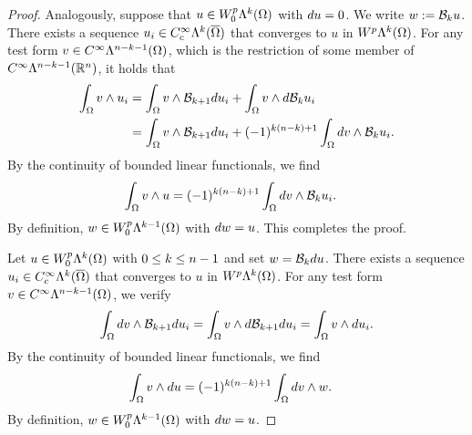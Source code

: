 \documentclass[10pt,a4paper]{article}
\begin{document}
\begin{proof}
    
    Analogously, suppose that $u \in W^{p}_{0}\Lambda^{k}(\Omega)$ with $d u = 0$. 
    We write $w := {\mathcal B}_{k} u$. 
    There exists a sequence $u_{i} \in C^{\infty}_{c}\Lambda^{k}(\overline\Omega)$ that converges to $u$ in $W^{p}\Lambda^{k}(\Omega)$. 
    For any test form $v \in C^{\infty}\Lambda^{n-k-1}(\Omega)$, 
    which is the restriction of some member of $C^{\infty}\Lambda^{n-k-1}({\mathbb R}^{n})$, 
    it holds that 
    \begin{align*}
        \int_{\Omega} v \wedge u_{i} 
        &=
        \int_{\Omega} v \wedge {\mathcal B}_{k+1} d u_{i}
        +
        \int_{\Omega} v \wedge d {\mathcal B}_{k  } u_{i}
        \\&=
        \int_{\Omega} v \wedge {\mathcal B}_{k+1} d u_{i}
        +
        (-1)^{k(n-k)+1}
        \int_{\Omega} d v \wedge {\mathcal B}_{k  } u_{i}
        .
    \end{align*}
    By the continuity of bounded linear functionals, we find 
    \begin{align*}
        \int_{\Omega} v \wedge u 
        &=
        (-1)^{k(n-k)+1}
        \int_{\Omega} d v \wedge {\mathcal B}_{k  } u_{i}
        .
    \end{align*}
    By definition, $w \in W^{p}_{0}\Lambda^{k-1}(\Omega)$ with $d w = u$.
    This completes the proof. 
    
    \color{blue}
    Let $u \in W^{p}_{0}\Lambda^{k}(\Omega)$ with $0 \leq k \leq n-1$ and set $w = {\mathcal B}_{k} d u$.
    There exists a sequence $u_{i} \in C^{\infty}_{c}\Lambda^{k}(\overline\Omega)$ that converges to $u$ in $W^{p}\Lambda^{k}(\Omega)$. 
    For any test form $v \in C^{\infty}\Lambda^{n-k-1}(\Omega)$, we verify 
    \begin{align*}
        \int_{\Omega} d v \wedge {\mathcal B}_{k+1} d u_{i}
        =
        \int_{\Omega} v \wedge d {\mathcal B}_{k+1} d u_{i}
        =
        \int_{\Omega} v \wedge d u_{i}
        .
    \end{align*}
    By the continuity of bounded linear functionals, we find 
    \begin{align*}
        \int_{\Omega} v \wedge d u 
        &=
        (-1)^{k(n-k)+1}
        \int_{\Omega} d v \wedge w
        .
    \end{align*}
    By definition, $w \in W^{p}_{0}\Lambda^{k-1}(\Omega)$ with $d w = u$.
    \color{black}
\end{proof}
\end{document}
